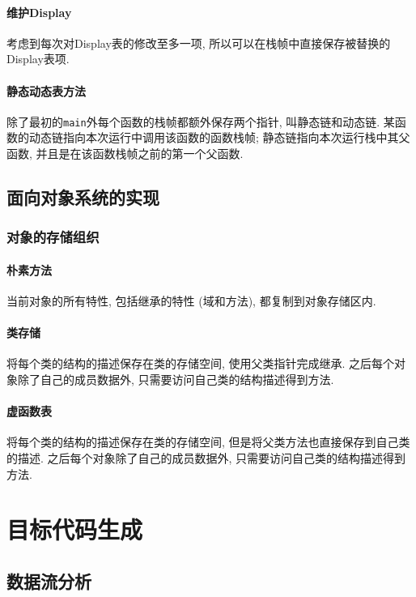 \documentclass{ctexart}
\begin{document}
\paragraph{维护Display}
    考虑到每次对Display表的修改至多一项,
    所以可以在栈帧中直接保存被替换的Display表项.
\paragraph{静态动态表方法}
    除了最初的\verb/main/外每个函数的栈帧都额外保存两个指针, 叫静态链和动态链.
    某函数的动态链指向本次运行中调用该函数的函数栈帧;
    静态链指向本次运行栈中其父函数, 并且是在该函数栈帧之前的第一个父函数.
\subsection{面向对象系统的实现}
\subsubsection{对象的存储组织}
\paragraph{朴素方法}
    当前对象的所有特性,
    包括继承的特性 (域和方法),
    都复制到对象存储区内.
\paragraph{类存储} 
    将每个类的结构的描述保存在类的存储空间, 使用父类指针完成继承.
    之后每个对象除了自己的成员数据外, 只需要访问自己类的结构描述得到方法.
\paragraph{虚函数表}
    将每个类的结构的描述保存在类的存储空间, 但是将父类方法也直接保存到自己类的描述.
    之后每个对象除了自己的成员数据外, 只需要访问自己类的结构描述得到方法.
    
\section{目标代码生成}
\subsection{数据流分析}
\end{document}
